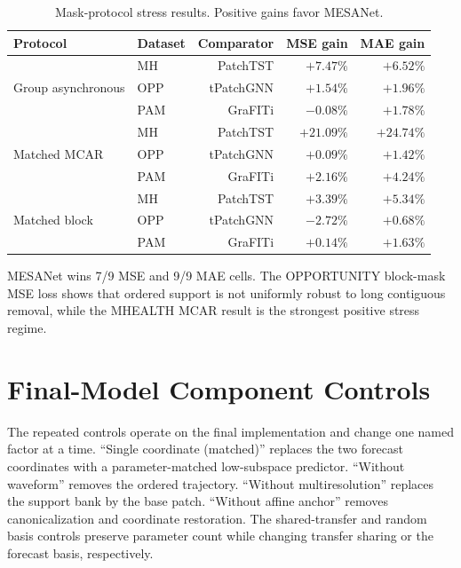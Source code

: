 \documentclass[letterpaper,10pt]{article}
\begin{document}
\begin{table}[H]
\centering
\setlength{\tabcolsep}{4pt}
\caption{Mask-protocol stress results. Positive gains favor MESANet.}
\label{tab:v673-mask}
\begin{tabular}{@{}llrrr@{}}
\toprule
Protocol & Dataset & Comparator & MSE gain & MAE gain \\
\midrule
\multirow{3}{*}{Group asynchronous}
 & MH & PatchTST & $+7.47\%$ & $+6.52\%$ \\
 & OPP & tPatchGNN & $+1.54\%$ & $+1.96\%$ \\
 & PAM & GraFITi & $-0.08\%$ & $+1.78\%$ \\
\midrule
\multirow{3}{*}{Matched MCAR}
 & MH & PatchTST & $+21.09\%$ & $+24.74\%$ \\
 & OPP & tPatchGNN & $+0.09\%$ & $+1.42\%$ \\
 & PAM & GraFITi & $+2.16\%$ & $+4.24\%$ \\
\midrule
\multirow{3}{*}{Matched block}
 & MH & PatchTST & $+3.39\%$ & $+5.34\%$ \\
 & OPP & tPatchGNN & $-2.72\%$ & $+0.68\%$ \\
 & PAM & GraFITi & $+0.14\%$ & $+1.63\%$ \\
\bottomrule
\end{tabular}
\end{table}

MESANet wins 7/9 MSE and 9/9 MAE cells. The OPPORTUNITY block-mask MSE
loss shows that ordered support is not uniformly robust to long contiguous
removal, while the MHEALTH MCAR result is the strongest positive stress regime.

\section{Final-Model Component Controls}

The repeated controls operate on the final implementation and change one named
factor at a time. ``Single coordinate (matched)'' replaces the two forecast
coordinates with a parameter-matched low-subspace predictor. ``Without
waveform'' removes the ordered trajectory. ``Without multiresolution'' replaces
the support bank by the base patch. ``Without affine anchor'' removes
canonicalization and coordinate restoration. The shared-transfer and random
basis controls preserve parameter count while changing transfer sharing or the
forecast basis, respectively.


\end{document}
